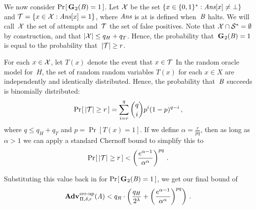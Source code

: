 We now consider $\Pr\hspace{-1pt}\left[\,\textup{\textbf{G}}\hspace{0.5pt}_2(\mathit{B})=1\,\right]$.
%
Let $\mathcal{X}$ be the set $\{ x \in \{0,1\}^* : \textit{Ans}[x] \ne \bot \}$ and $\mathcal{T} = \{x
\in\mathcal{X}: \textit{Ans}[x] = 1\}$, where $\textit{Ans}$ is at is defined when~$\mathit{B}$ halts. We
will call~$\mathcal{X}$ the set of attempts and~$\mathcal{T}$ the set of false positives.
%
Note that $\mathcal{X}\cap\mathcal{S}^*=\emptyset$ by construction, and that
$|\mathcal{X}| \leq q_H + q_T$.
%
Hence, the probability that~$\textup{\textbf{G}}\hspace{0.5pt}_2(\mathit{B})=1$ is equal to the probability
that~$|\mathcal{T}| \geq r$.

For each $x\in\mathcal{X}$, let $T(x)$ denote the event that $x\in\mathcal{T}$
%
In the random oracle model for~$H$, the set of random random variables $T(x)$
for each $x\in X$ are independently and identically distributed.
%
Hence, the probability that~$\mathit{B}$ succeeds is binomially distributed:
%
\begin{equation}
  \Pr\hspace{-1pt}\left[\, |\mathcal{T}| \geq r \,\right] =
     \sum_{i=r}^{q} \binom{q}{i}p^i(1-p)^{q-i} \,,
\end{equation}
%
where $q \leq q_H + q_T$ and $p = \Pr[T(x)=1]$. If we define
$\alpha = \frac{r}{pq}$, then as long as $\alpha > 1$ we can apply a standard
Chernoff bound to simplify this to
\begin{equation}
  \Pr\hspace{-1pt}\left[\, |\mathcal{T}| \geq r \,\right] <
     \left(\frac{e^{\alpha-1}}{\alpha^\alpha}\right)^{pq} \,.
\end{equation}

Substituting this value back in for $\Pr\hspace{-1pt}\left[\,\textup{\textbf{G}}\hspace{0.5pt}_2(\mathit{B})=1\,\right]$, we get our final
bound of
\begin{equation}
  \Adv{\errep}_{\Pi,\delta,r}(\advA) < q_R \cdot \left(\frac{q_H}{2^\lambda} + \left(\frac{e^{\alpha-1}}{\alpha^\alpha}\right)^{pq}\right) \,.
\end{equation}

%
